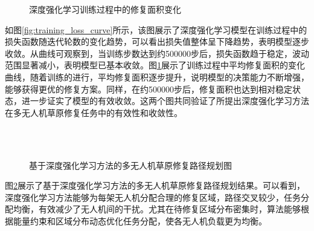 \documentclass[AutoFakeBold]{LZUThesis}
\begin{document}
\begin{figure}[H]
	\centering
	
	\caption{深度强化学习训练过程中的修复面积变化}
	\label{fig:training_reward_curve}
\end{figure}

如图\ref{fig:training_loss_curve}所示，该图展示了深度强化学习模型在训练过程中的损失函数随迭代轮数的变化趋势，可以看出损失值整体呈下降趋势，表明模型逐步收敛。从曲线可观察到，当训练步数达到约500000步后，损失函数趋于稳定，波动范围显著减小，表明模型已基本收敛。图\ref{fig:training_reward_curve}展示了训练过程中平均修复面积的变化曲线，随着训练的进行，平均修复面积逐步提升，说明模型的决策能力不断增强，能够获得更优的修复方案。同样，在约500000步后，修复面积也达到相对稳定状态，进一步证实了模型的有效收敛。这两个图共同验证了所提出深度强化学习方法在多无人机草原修复任务中的有效性和收敛性。

\begin{figure}[H]
	\centering
	\subfloat[60点500边长4机]{\label{fig:DRL_60_500_4}}
	\subfloat[60点500边长6机]{\label{fig:DRL_60_500_6}} 
	\subfloat[60点500边长8机]{\label{fig:DRL_60_500_8}}\\
	\subfloat[60点600边长4机]{\label{fig:CHAPBILM_60_500_4}}
	\subfloat[60点600边长6机]{\label{fig:CHAPBILM_60_500_6}}
	\subfloat[60点600边长8机]{\label{fig:CHAPBILM_60_500_8}}\\
	\subfloat[80点700边长4机]{\label{fig:DRL_80_500_4}}
	\subfloat[80点700边长6机]{\label{fig:DRL_80_500_6}}
	\subfloat[80点700边长8机]{\label{fig:DRL_80_500_9}}
	\caption{基于深度强化学习方法的多无人机草原修复路径规划图}
	\label{fig:RL_combined_uav_routes}
\end{figure}
图\ref{fig:RL_combined_uav_routes}展示了基于深度强化学习方法的多无人机草原修复路径规划结果。可以看到，深度强化学习方法能够为每架无人机分配合理的修复区域，路径交叉较少，任务分配均衡，有效减少了无人机间的干扰。尤其在待修复区域分布密集时，算法能够根据能量约束和区域分布动态优化任务分配，使各无人机负载更为均衡。
\end{document}
